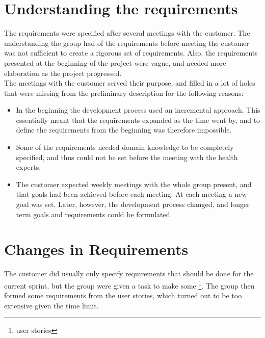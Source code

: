 \section{Understanding the requirements}

The requirements were specified after several meetings with the customer. The understanding the group had of the requirements before meeting the customer was not sufficient to create a rigorous set of requirements. Also, the requirements presented at the beginning of the project were vague, and needed more elaboration as the project progressed. \\

The meetings with the customer served their purpose, and filled in a lot of holes that were missing from the preliminary description for the following reasons:
\begin{itemize}
\item In the beginning the development process used an incremental approach. This essentially meant that the requirements expanded as the time went by, and to define the requirements from the beginning was therefore impossible.
\item Some of the requirements needed domain knowledge to be completely specified, and thus could not be set before the meeting with the health experts.
\item The customer expected weekly meetings with the whole group present, and that goals had been achieved before each meeting. At each meeting a new goal was set. Later, however, the development process changed, and longer term goals and requirements could be formulated. 
\end{itemize}

\section{Changes in Requirements}

The customer did usually only specify requirements that should be done for the current sprint, but the group were given a task to make some \footnote{user stories}. The group then formed some requirements from the user stories, which turned out to be too extensive given the time limit.

